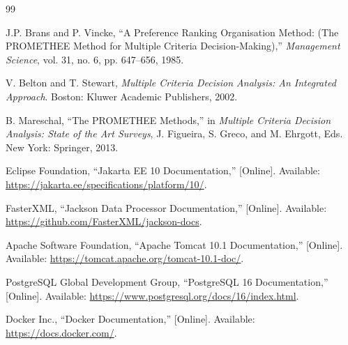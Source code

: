 \documentclass[12pt,a4paper,oneside]{report}
\begin{document}
\begin{thebibliography}{99}

J.P. Brans and P. Vincke, ``A Preference Ranking Organisation Method: (The PROMETHEE Method for Multiple Criteria Decision-Making),'' \textit{Management Science}, vol. 31, no. 6, pp. 647--656, 1985.

V. Belton and T. Stewart, \textit{Multiple Criteria Decision Analysis: An Integrated Approach}. Boston: Kluwer Academic Publishers, 2002.

B. Mareschal, ``The PROMETHEE Methods,'' in \textit{Multiple Criteria Decision Analysis: State of the Art Surveys}, J. Figueira, S. Greco, and M. Ehrgott, Eds. New York: Springer, 2013.

Eclipse Foundation, ``Jakarta EE 10 Documentation,'' [Online]. Available: \url{https://jakarta.ee/specifications/platform/10/}.

FasterXML, ``Jackson Data Processor Documentation,'' [Online]. Available: \url{https://github.com/FasterXML/jackson-docs}.

Apache Software Foundation, ``Apache Tomcat 10.1 Documentation,'' [Online]. Available: \url{https://tomcat.apache.org/tomcat-10.1-doc/}.

PostgreSQL Global Development Group, ``PostgreSQL 16 Documentation,'' [Online]. Available: \url{https://www.postgresql.org/docs/16/index.html}.

Docker Inc., ``Docker Documentation,'' [Online]. Available: \url{https://docs.docker.com/}.

\end{thebibliography}
\end{document}
